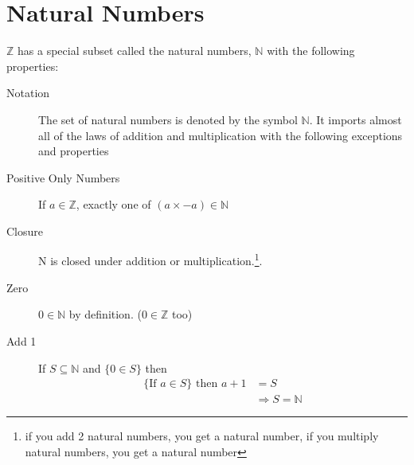 \section{Natural Numbers}
\label{sec:NaturalNumbers}
$\mathbb{Z}$ has a special subset called the natural numbers, $\mathbb{N}$
with the following properties:
\begin{description}
  \item[Notation] The set of natural numbers is denoted by the symbol
  $\mathbb{N}$. It imports almost all of the laws of addition and multiplication
  with the following exceptions and properties
  \item[Positive Only Numbers] If $a \in \mathbb{Z}$, exactly one of $(a \times
  -a) \in \mathbb{N}$
  \item[Closure] N is closed under addition or multiplication.\footnote{if you
  add 2 natural numbers, you get a natural number, if you multiply natural numbers,
  you get a natural number}.
  \item[Zero] $0 \in \mathbb{N}$ by definition. ($0 \in \mathbb{Z}$ too)
  \item[Add 1] If $S \subseteq \mathbb{N}$ and $\{0 \in S\}$ then
  \begin{align}
      \{ \text{If } a \in S \} \text{ then } a + 1 & = S \\
      & \Rightarrow S = \mathbb{N}
   \end{align}
\end{description}